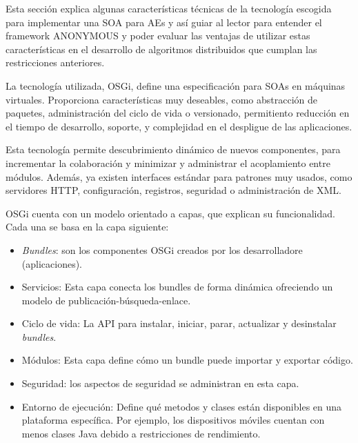 \documentclass[runningheads]{llncs}
\begin{document}
Esta sección explica algunas características técnicas de la tecnología escogida para implementar una SOA para AEs y así guiar al lector para entender el framework ANONYMOUS y poder evaluar las ventajas de utilizar estas características en el desarrollo de algoritmos distribuidos que cumplan las restricciones anteriores.

La tecnología utilizada, OSGi, define una especificación para SOAs en máquinas virtuales. Proporciona características muy deseables, como abstracción de paquetes, administración del ciclo de vida o versionado, permitiento reducción en el tiempo de desarrollo, soporte, y complejidad en el despligue de las aplicaciones.

Esta tecnología permite descubrimiento dinámico de nuevos componentes, para incrementar la colaboración y minimizar y administrar el acoplamiento entre módulos. Además, ya existen interfaces estándar para patrones muy usados, como servidores HTTP, configuración, registros, seguridad o administración de XML.

OSGi cuenta con un modelo orientado a capas, que explican su funcionalidad. Cada una se basa en la capa siguiente:

\begin{itemize}
\item {\em Bundles}: son los componentes OSGi creados por los desarrolladore
  (aplicaciones). %
\item Servicios: Esta capa conecta los bundles de forma dinámica ofreciendo un modelo de publicación-búsqueda-enlace.
\item Ciclo de vida: La API para instalar, iniciar, parar, actualizar y desinstalar {\em bundles}.
\item Módulos: Esta capa define cómo un bundle puede importar y exportar código.
\item Seguridad: los aspectos de seguridad se administran en esta capa.
\item Entorno de ejecución: Define qué metodos y clases están disponibles en una plataforma específica. Por ejemplo, los dispositivos móviles cuentan con menos clases Java debido a restricciones de rendimiento.
\end{itemize}
\end{document}
